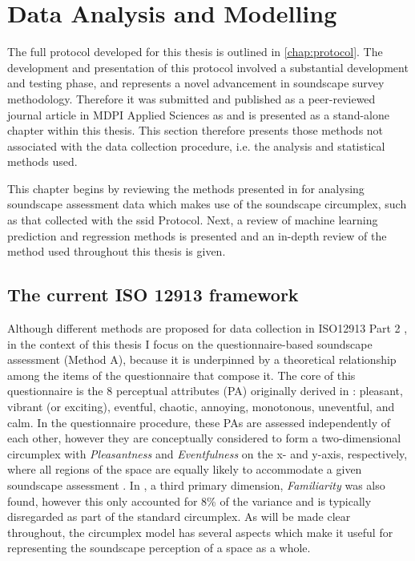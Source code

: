 \chapter{Data Analysis and Modelling}
\label{chap:methods}

 The full protocol developed for this thesis is outlined in \cref{chap:protocol}. The development and presentation of this protocol involved a substantial development and testing phase, and represents a novel advancement in soundscape survey methodology. Therefore it was submitted and published as a peer-reviewed journal article in MDPI Applied Sciences as \citet{Mitchell2020Soundscape} and is presented as a stand-alone chapter within this thesis. This section therefore presents those methods not associated with the data collection procedure, i.e. the analysis and statistical methods used.

This chapter begins by reviewing the methods presented in \citet{ISO12913Part2} for analysing soundscape assessment data which makes use of the soundscape circumplex, such as that collected with the \gls{ssid} Protocol. Next, a review of machine learning prediction and regression methods is presented and an in-depth review of the  method used throughout this thesis is given. 

\section{The current ISO 12913 framework}
\label{sec:current}
Although different methods are proposed for data collection in ISO12913 Part 2 \citep{ISO12913Part2}, in the context of this thesis I focus on the questionnaire-based soundscape assessment (Method A), because it is underpinned by a theoretical relationship among the items of the questionnaire that compose it. The core of this questionnaire is the 8 perceptual attributes (PA) originally derived in \citet{Axelsson2010principal}: pleasant, vibrant (or exciting), eventful, chaotic, annoying, monotonous, uneventful, and calm. In the questionnaire procedure, these PAs are assessed independently of each other, however they are conceptually considered to form a two-dimensional circumplex with \textit{Pleasantness} and \textit{Eventfulness} on the x- and y-axis, respectively, where all regions of the space are equally likely to accommodate a given soundscape assessment \citep{Aletta2016Soundscape}. In \citet{Axelsson2010principal}, a third primary dimension, \textit{Familiarity} was also found, however this only accounted for 8\% of the variance and is typically disregarded as part of the standard circumplex. As will be made clear throughout, the circumplex model has several aspects which make it useful for representing the soundscape perception of a space as a whole.

